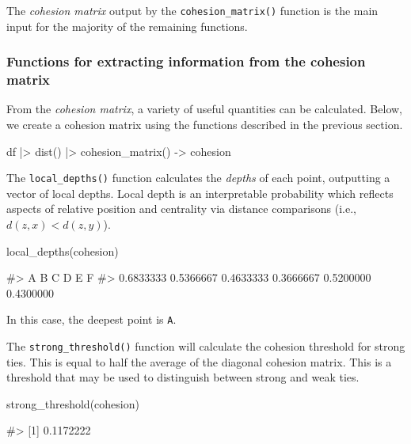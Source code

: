 The \emph{cohesion matrix} output by the \texttt{cohesion\_matrix()}
function is the main input for the majority of the remaining functions.

\hypertarget{functions-for-extracting-information-from-the-cohesion-matrix}{%
\subsubsection{Functions for extracting information from the cohesion
matrix}\label{functions-for-extracting-information-from-the-cohesion-matrix}}

From the \emph{cohesion matrix}, a variety of useful quantities can be
calculated. Below, we create a cohesion matrix using the functions
described in the previous section.

\begin{Schunk}
\begin{Sinput}
df |>
  dist() |>
  cohesion_matrix() -> cohesion
\end{Sinput}
\end{Schunk}

The \texttt{local\_depths()} function calculates the \emph{depths} of
each point, outputting a vector of local depths. Local depth is an
interpretable probability which reflects aspects of relative position
and centrality via distance comparisons (i.e., \(d(z, x) < d(z, y)\)).

\begin{Schunk}
\begin{Sinput}
local_depths(cohesion)
\end{Sinput}
\begin{Soutput}
#>         A         B         C         D         E         F 
#> 0.6833333 0.5366667 0.4633333 0.3666667 0.5200000 0.4300000
\end{Soutput}
\end{Schunk}

In this case, the deepest point is \texttt{A}.

The \texttt{strong\_threshold()} function will calculate the cohesion
threshold for strong ties. This is equal to half the average of the
diagonal cohesion matrix.\citep{berenhaut2022social} This is a threshold
that may be used to distinguish between strong and weak ties.

\begin{Schunk}
\begin{Sinput}
strong_threshold(cohesion)
\end{Sinput}
\begin{Soutput}
#> [1] 0.1172222
\end{Soutput}
\end{Schunk}


